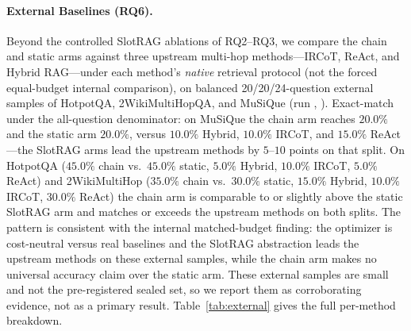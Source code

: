\paragraph{External Baselines (RQ6).} Beyond the controlled SlotRAG
ablations of RQ2--RQ3, we compare the chain and static arms against three
upstream multi-hop methods---IRCoT, ReAct, and Hybrid RAG---under each
method's \emph{native} retrieval protocol (not the forced equal-budget
internal comparison), on balanced 20/20/24-question external samples of
HotpotQA, 2WikiMultiHopQA, and MuSiQue (run ,
). Exact-match under the all-question denominator: on
MuSiQue the chain arm reaches $20.0\%$ and the static arm $20.0\%$, versus
$10.0\%$ Hybrid, $10.0\%$ IRCoT, and $15.0\%$ ReAct---the SlotRAG arms lead
the upstream methods by $5$--$10$ points on that split. On HotpotQA
($45.0\%$ chain vs.\ $45.0\%$ static, $5.0\%$ Hybrid, $10.0\%$ IRCoT,
$5.0\%$ ReAct) and 2WikiMultiHop ($35.0\%$ chain vs.\ $30.0\%$ static,
$15.0\%$ Hybrid, $10.0\%$ IRCoT, $30.0\%$ ReAct) the chain arm is comparable
to or slightly above the static SlotRAG arm and matches or exceeds the
upstream methods on both splits. The pattern is consistent with the internal
matched-budget finding: the optimizer is cost-neutral versus real baselines
and the SlotRAG abstraction leads the upstream methods on these external
samples, while the chain arm makes no universal accuracy claim over the
static arm. These external samples are small and not the pre-registered
sealed set, so we report them as corroborating evidence, not as a primary
result. Table~\ref{tab:external} gives the full per-method breakdown.


